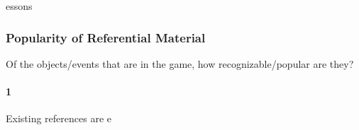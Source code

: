 essons\subsubsection{Popularity of Referential Material}Of the objects/events that are in the game, how recognizable/popular are they?\paragraph{1}Existing references are e